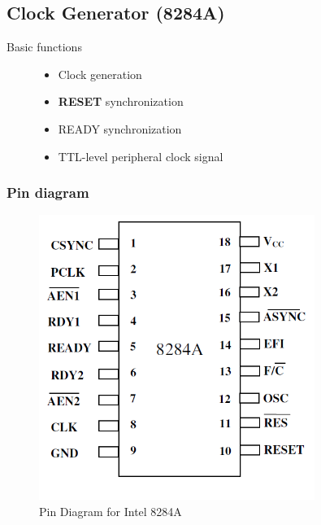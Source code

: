 \documentclass{article}
\begin{document}
\subsection{Clock Generator (8284A)}
\begin{description}
  \item[Basic functions]
  \begin{itemize}
    \item Clock generation
    \item \textbf{RESET} synchronization
    \item READY synchronization
    \item TTL-level peripheral clock signal
  \end{itemize}
\end{description}
\newpage
\subsubsection{Pin diagram}
\begin{figure}[h!]
    \centering
    \includegraphics[width = 0.8\textwidth]{figures/8284A.png}
    \caption{Pin Diagram for Intel 8284A}
    \label{fig:bl}
\end{figure}
\end{document}
